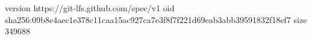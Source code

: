 version https://git-lfs.github.com/spec/v1
oid sha256:09b8e4aec1e378c11caa15ac927ca7e3f8f7f221d69eab3abb39591832f18ef7
size 349688
